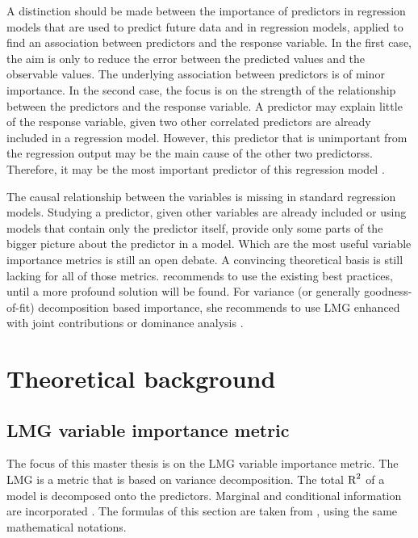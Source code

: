 \documentclass[11pt,a4paper,twoside]{book}\usepackage[]{graphicx}\usepackage[]{color}
\begin{document}
A distinction should be made between the importance of predictors in regression models that are used to predict future data and in regression models, applied to find an association between predictors and the response variable. In the first case, the aim is only to reduce the error between the predicted values and the observable values. The underlying association between predictors is of minor importance. In the second case, the focus is on the strength of the relationship between the predictors and the response variable. A predictor may explain little of the response variable, given two other correlated predictors are already included in a regression model. However, this predictor that is unimportant from the regression output may be the main cause  of the other two predictorss. Therefore, it may be the most important predictor of this regression model \citep{Gromping2007}. 

The causal relationship between the variables is missing in standard regression models. Studying a predictor, given other variables are already included or using models that contain only  the predictor itself,  provide only some parts of the bigger picture about the predictor in a model. Which  are the most useful variable importance metrics is still an open debate. A convincing theoretical basis is still lacking for all of those metrics.  \cite{Gromping2015} recommends to use the existing best practices, until a more profound solution will be found. For variance (or generally goodness-of-fit) decomposition based importance, she recommends to use LMG enhanced with joint contributions or dominance analysis \citep{Gromping2015}.
















\chapter{Theoretical background} 

\section{LMG variable importance metric}

The focus of this master thesis is on the LMG variable importance metric. The LMG is a metric that is based on variance decomposition. The total $\text{R}^2$ of a model is decomposed onto the predictors. Marginal and conditional information are incorporated \citep{Gromping2015} .  The  formulas of this section are taken from \cite{Gromping2015}, using the same mathematical notations. 
\end{document}
